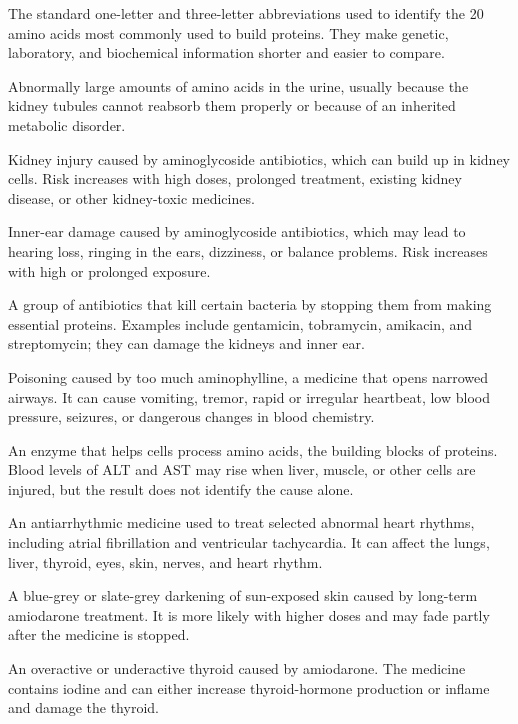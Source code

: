  The standard one-letter and three-letter abbreviations used to identify the 20 amino acids most commonly used to build proteins. They make genetic, laboratory, and biochemical information shorter and easier to compare.

 Abnormally large amounts of amino acids in the urine, usually because the kidney tubules cannot reabsorb them properly or because of an inherited metabolic disorder.

 Kidney injury caused by aminoglycoside antibiotics, which can build up in kidney cells. Risk increases with high doses, prolonged treatment, existing kidney disease, or other kidney-toxic medicines.

 Inner-ear damage caused by aminoglycoside antibiotics, which may lead to hearing loss, ringing in the ears, dizziness, or balance problems. Risk increases with high or prolonged exposure.

 A group of antibiotics that kill certain bacteria by stopping them from making essential proteins. Examples include gentamicin, tobramycin, amikacin, and streptomycin; they can damage the kidneys and inner ear.

 Poisoning caused by too much aminophylline, a medicine that opens narrowed airways. It can cause vomiting, tremor, rapid or irregular heartbeat, low blood pressure, seizures, or dangerous changes in blood chemistry.

 An enzyme that helps cells process amino acids, the building blocks of proteins. Blood levels of ALT and AST may rise when liver, muscle, or other cells are injured, but the result does not identify the cause alone.

 An antiarrhythmic medicine used to treat selected abnormal heart rhythms, including atrial fibrillation and ventricular tachycardia. It can affect the lungs, liver, thyroid, eyes, skin, nerves, and heart rhythm.

 A blue-grey or slate-grey darkening of sun-exposed skin caused by long-term amiodarone treatment. It is more likely with higher doses and may fade partly after the medicine is stopped.

 An overactive or underactive thyroid caused by amiodarone. The medicine contains iodine and can either increase thyroid-hormone production or inflame and damage the thyroid.

